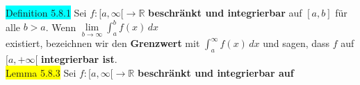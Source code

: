 \documentclass[10pt]{article}
\begin{document}
\colorbox{cyan}{Definition 5.8.1} Sei 
                \textcolor{NavyBlue}{$f:[a,\infty[\longrightarrow\mathbb{R}$}
                \textbf{beschränkt und integrierbar} auf 
                \textcolor{NavyBlue}{$[a,b]$} für alle 
                \textcolor{NavyBlue}{$b>a$}. 
                Wenn \textcolor{NavyBlue}{$\lim\limits_{b\to\infty}\int_a^bf(x)\,dx$} \\
        \indent existiert, bezeichnen wir den \textbf{Grenzwert} mit 
                \textcolor{NavyBlue}{$\int_a^\infty f(x)\,dx$} 
                und sagen, dass \textcolor{NavyBlue}{$f$} auf 
                \textcolor{NavyBlue}{$[a,+\infty[$} \textbf{integrierbar ist}.\\
\colorbox{yellow}{Lemma 5.8.3} Sei \textcolor{NavyBlue}{$f:[a,\infty[\longrightarrow\mathbb{R}$} 
                \textbf{beschränkt und integrierbar auf} 
\end{document}
